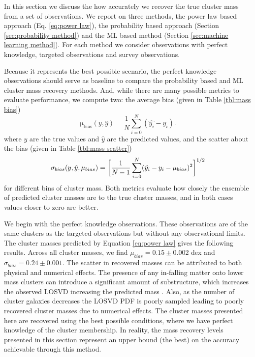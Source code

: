 \documentclass[fleqn,usenatbib]{mnras}
\begin{document}
In this section we discuss the how accurately we recover the true cluster mass from a set of observations. We report on three methods, the power law based approach (Eq. \ref{eq:power law}), the probability based approach (Section \ref{sec:probability method}) and the ML based method (Section \ref{sec:machine learning method}). For each method we consider observations with perfect knowledge, targeted observations and survey observations.

Because it represents the best possible scenario, the perfect knowledge observations should serve as baseline to compare the probability based and ML cluster mass recovery methods. And, while there are many possible metrics to evaluate performance, we compute two: the average bias (given in Table \ref{tbl:mass bias})
\begin{equation}
\mathrm{\mu_{bias}}(y,\hat{y}) = \frac{1}{N} \sum_{i=0}^N (\hat{y_i} - y_i).
\end{equation}
where $y$ are the true values and $\hat{y}$ are the predicted values, and the scatter about the bias (given in Table \ref{tbl:mass scatter})
\begin{equation}
	\sigma_{bias}(y,\hat{y}, \mu_{bias}) = \bigg{[}\frac{1}{N-1} \sum_{i=0}^N (\hat{y_i} - y_i - \mu_{bias})^2 \bigg{]}^{1/2}
\end{equation}
for different bins of cluster mass. Both metrics evaluate how closely the ensemble of predicted cluster masses are to the true cluster masses, and in both cases values closer to zero are better.

We begin with the perfect knowledge observations. These observations are of the same clusters as the targeted observations but without any observational limits. The cluster masses predicted by Equation \ref{eq:power law} gives the following results. Across all cluster masses, we find $\mu_{bias} = 0.15\pm{0.002}$ dex and $\sigma_{bias} = 0.24\pm{0.001}$. The scatter in recovered masses can be attributed to both physical and numerical effects. The presence of any in-falling matter onto lower mass clusters can introduce a significant amount of substructure, which increases the observed LOSVD increasing the predicted mass . Also, as the number of cluster galaxies decreases the LOSVD PDF is poorly sampled leading to poorly recovered cluster masses due to numerical effects. The cluster masses presented here are recovered using the best possible conditions, where we have perfect knowledge of the cluster membership. In reality, the mass recovery levels presented in this section represent an upper bound (the best) on the accuracy achievable through this method.
\end{document}
